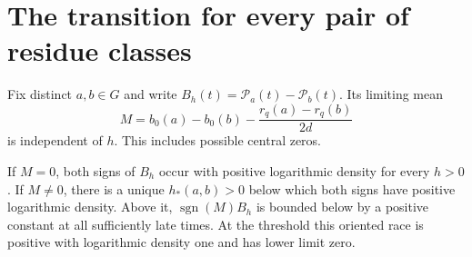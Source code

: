 \section{The transition for every pair of residue classes}
\label{sec:generalthreshold}

Fix distinct $a,b\in G$ and write $B_h(t)=\mathcal P_a(t)-\mathcal P_b(t)$.
Its limiting mean
\[
 M=b_0(a)-b_0(b)-\frac{r_q(a)-r_q(b)}{2d}
\]
is independent of $h$. This includes possible central zeros.
\begin{theorem}\label{th:generaltransition}
If $M=0$, both signs of $B_h$ occur with positive logarithmic density
for every $h>0$. If $M\ne0$, there is a unique $h_*(a,b)>0$ below
which both signs have positive logarithmic density. Above it,
$\operatorname{sgn}(M) B_h$ is bounded below by a positive constant
at all sufficiently late times. At the threshold this oriented race
is positive with logarithmic density one and has lower limit zero.
\end{theorem}

